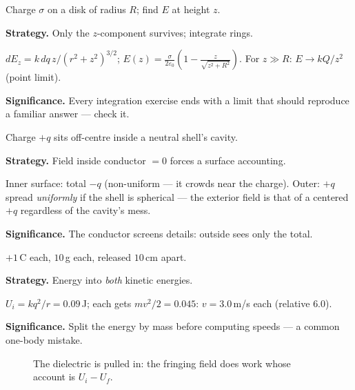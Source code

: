 \begin{example}\label{ex:w11}
Charge $\sigma$ on a disk of radius $R$; find $E$ at height $z$.
\par\smallskip
\textbf{Strategy.} Only the $z$-component survives; integrate rings.
\begin{solution}
$dE_z=k\,dq\,z/(r^{2}+z^{2})^{3/2}$;
$E(z)=\frac{\sigma}{2\varepsilon_0}\left(1-\frac{z}{\sqrt{z^{2}+R^{2}}}\right)$.
For $z\gg R$: $E\to kQ/z^{2}$ (point limit). \checkmark
\end{solution}
\textbf{Significance.} Every integration exercise ends with a limit
that should reproduce a familiar answer --- check it.
\end{example}

\begin{example}\label{ex:w12}
Charge $+q$ sits off-centre inside a neutral shell's cavity.
\par\smallskip
\textbf{Strategy.} Field inside conductor $=0$ forces a surface
accounting.
\begin{solution}
Inner surface: total $-q$ (non-uniform --- it crowds near the charge).
Outer: $+q$ spread \emph{uniformly} if the shell is spherical ---
the exterior field is that of a centered $+q$ regardless of the
cavity's mess. \checkmark
\end{solution}
\textbf{Significance.} The conductor screens details: outside sees
only the total.
\end{example}

\begin{example}\label{ex:w13}
$+1$\,\textmu C each, $10$\,g each, released $10$\,cm apart.
\par\smallskip
\textbf{Strategy.} Energy into \emph{both} kinetic energies.
\begin{solution}
$U_i=kq^{2}/r=0.09$\,J; each gets $mv^{2}/2=0.045$:
$v=3.0$\,m/s each (relative $6.0$). \checkmark
\end{solution}
\textbf{Significance.} Split the energy by mass before computing
speeds --- a common one-body mistake.
\end{example}

\begin{figure}[htbp]\centering

\caption{The dielectric is pulled in: the fringing field does work
whose account is $U_i-U_f$.}
\label{fig:diel}
\end{figure}

